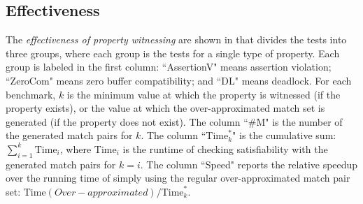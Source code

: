 \subsection{Effectiveness}

The \textit{effectiveness of property witnessing} are shown in  that divides the tests into three groups, where each group is the tests for a single type of property. Each group is labeled in the first column: ``AssertionV" means assertion violation; ``ZeroCom" means zero buffer compatibility; and ``DL" means deadlock. For each benchmark, $k$ is the minimum value at which the property is witnessed (if the property exists), or the value at which the over-approximated match set is generated (if the property does not exist). 
The column ``\#M" is the number of the generated match pairs for $k$. 
The column ``$\mathrm{Time}_k^\ast$" is the cumulative sum: $\sum_{i=1}^k\mathrm{Time}_i$, where $\mathrm{Time}_i$ is the runtime of checking satisfiability with the generated match pairs for $k=i$.
The column ``Speed" reports the relative speedup over the running time of simply using the regular over-approximated match pair set: $\mathrm{Time}(Over-approximated) / \mathrm{Time}_k^\ast$.

